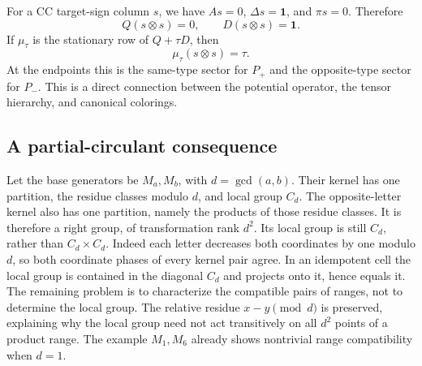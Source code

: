 For a CC target-sign column $s$, we have $As=0$, $\Delta s=\mathbf1$,
and $\pi s=0$. Therefore
\[
 Q(s\otimes s)=0,\qquad D(s\otimes s)=\mathbf1.
\]
If $\mu_\tau$ is the stationary row of $Q+\tau D$, then
\[
 \mu_\tau(s\otimes s)=\tau.
\]
At the endpoints this is the same-type sector for $P_+$ and the
opposite-type sector for $P_-$. This is a direct connection between
the potential operator, the tensor hierarchy, and canonical colorings.

\subsection{A partial-circulant consequence}
Let the base generators be $M_a,M_b$, with $d=\gcd(a,b)$. Their kernel
has one partition, the residue classes modulo $d$, and local group $C_d$.
The opposite-letter kernel also has one partition, namely the products
of those residue classes. It is therefore a right group, of transformation
rank $d^2$. Its local group is still $C_d$, rather than $C_d\times C_d$.
Indeed each letter decreases both coordinates by one modulo $d$, so
both coordinate phases of every kernel pair agree. In an idempotent cell
the local group is contained in the diagonal $C_d$ and projects onto it,
hence equals it. The remaining problem is to characterize the compatible
pairs of ranges, not to determine the local group.
The relative residue $x-y\pmod d$ is preserved, explaining why the local
group need not act transitively on all $d^2$ points of a product range.
The example $M_1,M_6$ already shows nontrivial range compatibility when $d=1$.
